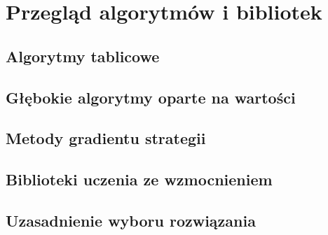 \section{Przegląd algorytmów i bibliotek}
\label{sec:przeglad}

\subsection{Algorytmy tablicowe}
\subsection{Głębokie algorytmy oparte na wartości}
\subsection{Metody gradientu strategii}
\subsection{Biblioteki uczenia ze wzmocnieniem}
\subsection{Uzasadnienie wyboru rozwiązania}